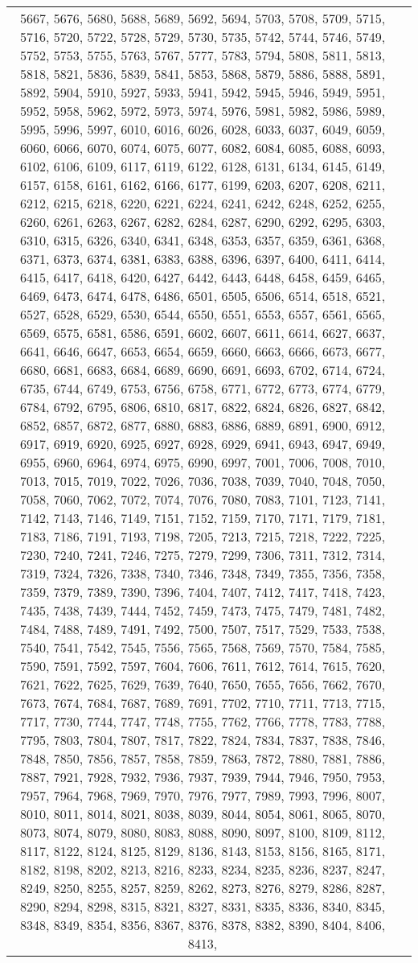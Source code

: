 \documentclass[12pt]{article}
\begin{document}
\begin{tabular}{|c|p{17cm}|}
5667, 5676, 5680, 5688, 5689, 5692, 5694, 5703, 5708, 5709, 5715, 5716, 5720, 5722, 5728, 5729, 5730, 5735, 5742, 5744, 5746, 5749, 5752, 5753, 5755, 5763, 5767, 5777, 5783, 5794, 5808, 5811, 5813, 5818, 5821, 5836, 5839, 5841, 5853, 5868, 5879, 5886, 5888, 5891, 5892, 5904, 5910, 5927, 5933, 5941, 5942, 5945, 5946, 5949, 5951, 5952, 5958, 5962, 5972, 5973, 5974, 5976, 5981, 5982, 5986, 5989, 5995, 5996, 5997, 6010, 6016, 6026, 6028, 6033, 6037, 6049, 6059, 6060, 6066, 6070, 6074, 6075, 6077, 6082, 6084, 6085, 6088, 6093, 6102, 6106, 6109, 6117, 6119, 6122, 6128, 6131, 6134, 6145, 6149, 6157, 6158, 6161, 6162, 6166, 6177, 6199, 6203, 6207, 6208, 6211, 6212, 6215, 6218, 6220, 6221, 6224, 6241, 6242, 6248, 6252, 6255, 6260, 6261, 6263, 6267, 6282, 6284, 6287, 6290, 6292, 6295, 6303, 6310, 6315, 6326, 6340, 6341, 6348, 6353, 6357, 6359, 6361, 6368, 6371, 6373, 6374, 6381, 6383, 6388, 6396, 6397, 6400, 6411, 6414, 6415, 6417, 6418, 6420, 6427, 6442, 6443, 6448, 6458, 6459, 6465, 6469, 6473, 6474, 6478, 6486, 6501, 6505, 6506, 6514, 6518, 6521, 6527, 6528, 6529, 6530, 6544, 6550, 6551, 6553, 6557, 6561, 6565, 6569, 6575, 6581, 6586, 6591, 6602, 6607, 6611, 6614, 6627, 6637, 6641, 6646, 6647, 6653, 6654, 6659, 6660, 6663, 6666, 6673, 6677, 6680, 6681, 6683, 6684, 6689, 6690, 6691, 6693, 6702, 6714, 6724, 6735, 6744, 6749, 6753, 6756, 6758, 6771, 6772, 6773, 6774, 6779, 6784, 6792, 6795, 6806, 6810, 6817, 6822, 6824, 6826, 6827, 6842, 6852, 6857, 6872, 6877, 6880, 6883, 6886, 6889, 6891, 6900, 6912, 6917, 6919, 6920, 6925, 6927, 6928, 6929, 6941, 6943, 6947, 6949, 6955, 6960, 6964, 6974, 6975, 6990, 6997, 7001, 7006, 7008, 7010, 7013, 7015, 7019, 7022, 7026, 7036, 7038, 7039, 7040, 7048, 7050, 7058, 7060, 7062, 7072, 7074, 7076, 7080, 7083, 7101, 7123, 7141, 7142, 7143, 7146, 7149, 7151, 7152, 7159, 7170, 7171, 7179, 7181, 7183, 7186, 7191, 7193, 7198, 7205, 7213, 7215, 7218, 7222, 7225, 7230, 7240, 7241, 7246, 7275, 7279, 7299, 7306, 7311, 7312, 7314, 7319, 7324, 7326, 7338, 7340, 7346, 7348, 7349, 7355, 7356, 7358, 7359, 7379, 7389, 7390, 7396, 7404, 7407, 7412, 7417, 7418, 7423, 7435, 7438, 7439, 7444, 7452, 7459, 7473, 7475, 7479, 7481, 7482, 7484, 7488, 7489, 7491, 7492, 7500, 7507, 7517, 7529, 7533, 7538, 7540, 7541, 7542, 7545, 7556, 7565, 7568, 7569, 7570, 7584, 7585, 7590, 7591, 7592, 7597, 7604, 7606, 7611, 7612, 7614, 7615, 7620, 7621, 7622, 7625, 7629, 7639, 7640, 7650, 7655, 7656, 7662, 7670, 7673, 7674, 7684, 7687, 7689, 7691, 7702, 7710, 7711, 7713, 7715, 7717, 7730, 7744, 7747, 7748, 7755, 7762, 7766, 7778, 7783, 7788, 7795, 7803, 7804, 7807, 7817, 7822, 7824, 7834, 7837, 7838, 7846, 7848, 7850, 7856, 7857, 7858, 7859, 7863, 7872, 7880, 7881, 7886, 7887, 7921, 7928, 7932, 7936, 7937, 7939, 7944, 7946, 7950, 7953, 7957, 7964, 7968, 7969, 7970, 7976, 7977, 7989, 7993, 7996, 8007, 8010, 8011, 8014, 8021, 8038, 8039, 8044, 8054, 8061, 8065, 8070, 8073, 8074, 8079, 8080, 8083, 8088, 8090, 8097, 8100, 8109, 8112, 8117, 8122, 8124, 8125, 8129, 8136, 8143, 8153, 8156, 8165, 8171, 8182, 8198, 8202, 8213, 8216, 8233, 8234, 8235, 8236, 8237, 8247, 8249, 8250, 8255, 8257, 8259, 8262, 8273, 8276, 8279, 8286, 8287, 8290, 8294, 8298, 8315, 8321, 8327, 8331, 8335, 8336, 8340, 8345, 8348, 8349, 8354, 8356, 8367, 8376, 8378, 8382, 8390, 8404, 8406, 8413, 
\end{tabular}
\end{document}
